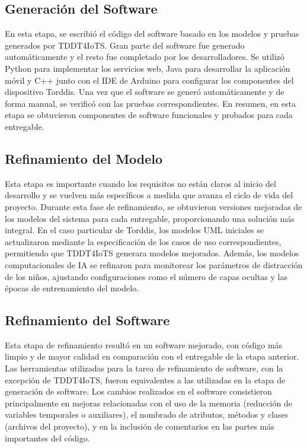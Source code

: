\documentclass[a4paper,fleqn]{cas-sc}
\begin{document}
	\subsection{Generación del Software}
	En esta etapa, se escribió el código del software basado en los modelos y pruebas generados por TDDT4IoTS. Gran parte del software fue generado automáticamente y el resto fue completado por los desarrolladores. Se utilizó Python para implementar los servicios web, Java para desarrollar la aplicación móvil y C++ junto con el IDE de Arduino para configurar los componentes del dispositivo Torddis. Una vez que el software se generó automáticamente y de forma manual, se verificó con las pruebas correspondientes. En resumen, en esta etapa se obtuvieron componentes de software funcionales y probados para cada entregable.
	
	\subsection{Refinamiento del Modelo}
	Esta etapa es importante cuando los requisitos no están claros al inicio del desarrollo y se vuelven más específicos a medida que avanza el ciclo de vida del proyecto. Durante esta fase de refinamiento, se obtuvieron versiones mejoradas de los modelos del sistema para cada entregable, proporcionando una solución más integral. En el caso particular de Torddis, los modelos UML iniciales se actualizaron mediante la especificación de los casos de uso correspondientes, permitiendo que TDDT4IoTS generara modelos mejorados. Además, los modelos computacionales de IA se refinaron para monitorear los parámetros de distracción de los niños, ajustando configuraciones como el número de capas ocultas y las épocas de entrenamiento del modelo.
	
	\subsection{Refinamiento del Software}
	Esta etapa de refinamiento resultó en un software mejorado, con código más limpio y de mayor calidad en comparación con el entregable de la etapa anterior. Las herramientas utilizadas para la tarea de refinamiento de software, con la excepción de TDDT4IoTS, fueron equivalentes a las utilizadas en la etapa de generación de software. Los cambios realizados en el software consistieron principalmente en mejoras relacionadas con el uso de la memoria (reducción de variables temporales o auxiliares), el nombrado de atributos, métodos y clases (archivos del proyecto), y en la inclusión de comentarios en las partes más importantes del código.
	
\end{document}
